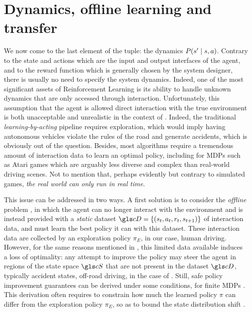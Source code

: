 \section{Dynamics, offline learning and transfer}

We now come to the last element of the  tuple: the dynamics $P\lparen s'\mid s,a\rparen$. Contrary to the state and actions which are the input and output interfaces of the agent, and to the reward function which is generally chosen by the system designer, there is usually no need to specify the system dynamics. Indeed, one of the most significant assets of Reinforcement Learning is its ability to handle unknown dynamics that are only accessed through interaction. Unfortunately, this assumption that the agent is allowed direct interaction with the true environment is both unacceptable and unrealistic in the context of . Indeed, the traditional \emph{learning-by-acting} pipeline requires exploration, which would imply having autonomous vehicles violate the rules of the road and generate accidents, which is obviously out of the question. Besides, most  algorithms require a tremendous amount of interaction data to learn an optimal policy, including for \glspl{MDP} such as Atari games which are arguably less diverse and complex than real-world driving scenes. Not to mention that, perhaps evidently but contrary to simulated games, \emph{the real world can only run in real time}.

This issue can be addressed in two ways. A first solution is to consider the \emph{offline}  problem \citep{levine2020offline}, in which the agent can no longer interact with the environment and is instead provided with a \emph{static} dataset $\cD = \{(s_t, a_t, r_t, s_{t+1})\}$ of interaction data, and must learn the best policy it can with this dataset. These interaction data are collected by an exploration policy $\pi_E$, in our case, human driving. However, for the same reasons mentioned in , this limited data available induces a loss of optimality: any attempt to improve the policy may steer the agent in regions of the state space $\cS$ that are not present in the dataset $\cD$, typically accident states, off-road driving, \etc in the case of . Still, safe policy improvement guarantees can be derived under some conditions, \eg for finite \glspl{MDP} \citep{Laroche2019,Nadjahi2019}. This derivation often requires to constrain how much the learned policy $\pi$ can differ from the exploration policy $\pi_E$, so as to bound the state distribution shift \citep{Kakade2002,Schulman2015}.

